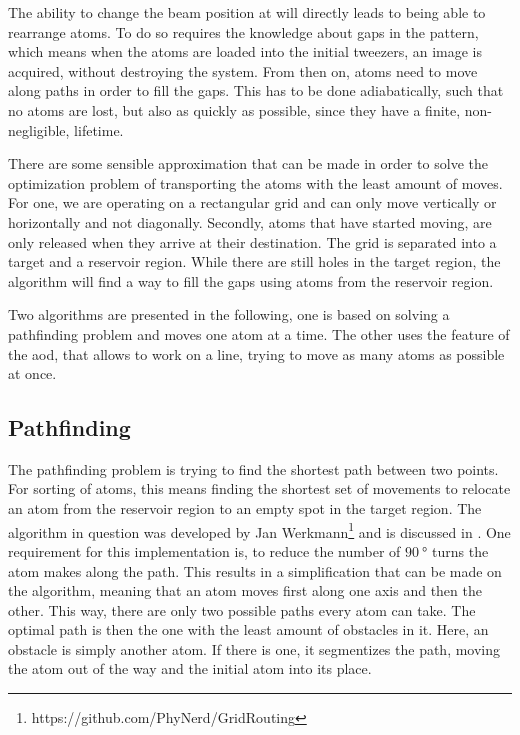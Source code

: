 The ability to change the beam position at will directly leads to being able to rearrange atoms. To do so requires the knowledge about gaps in the pattern, which means when the atoms are loaded into the initial tweezers, an image is acquired, without destroying the system. From then on, atoms need to move along paths in order to fill the gaps. This has to be done adiabatically, such that no atoms are lost, but also as quickly as possible, since they have a finite, non-negligible, lifetime.

There are some sensible approximation that can be made in order to solve the optimization problem of transporting the atoms with the least amount of moves. For one, we are operating on a rectangular grid and can only move vertically or horizontally and not diagonally. Secondly, atoms that have started moving, are only released when they arrive at their destination.
The grid is separated into a target and a reservoir region. While there are still holes in the target region, the algorithm will find a way to fill the gaps using atoms from the reservoir region.

Two algorithms are presented in the following, one is based on solving a pathfinding problem and moves one atom at a time. The other uses the feature of the \ac{aod}, that allows to work on a line, trying to move as many atoms as possible at once.


\subsection{Pathfinding}

The pathfinding problem is trying to find the shortest path between two points. For sorting of atoms, this means finding the shortest set of movements to relocate an atom from the reservoir region to an empty spot in the target region.
The algorithm in question was developed by Jan Werkmann\footnote{https://github.com/PhyNerd/GridRouting}  and is discussed in \cite{OhldeMello2020}. One requirement for this implementation is, to reduce the number of $\SI{90}{\degree}$ turns the atom makes along the path. This results in a simplification that can be made on the algorithm, meaning that an atom moves first along one axis and then the other. This way, there are only two possible paths every atom can take. The optimal path is then the one with the least amount of obstacles in it. Here, an obstacle is simply another atom. If there is one, it segmentizes the path, moving the atom out of the way and the initial atom into its place.

